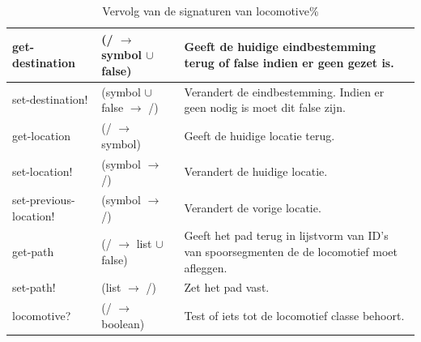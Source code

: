 \documentclass{article}
\begin{document}
\begin{table}[h!]
        \centering
        \begin{tabular}{|p{2.9cm}|p{4cm}|p{6.1cm}|}
                \hline
                get-destination & (/ $\rightarrow$ symbol $\cup$ false) & Geeft de huidige eindbestemming terug of false indien er geen gezet is.\\
                \hline
                set-destination! & (symbol $\cup$ false $\rightarrow$ /) & Verandert de eindbestemming. Indien er geen nodig is moet dit false zijn. \\
                \hline
                get-location & (/ $\rightarrow$ symbol) & Geeft de huidige locatie terug.\\
                \hline
                set-location! & (symbol $\rightarrow$ /) & Verandert de huidige locatie.\\
                \hline
                set-previous-location! & (symbol $\rightarrow$ /) & Verandert de vorige locatie.\\
                \hline
                get-path & (/ $\rightarrow$ list $\cup$ false) & Geeft het pad terug in lijstvorm van ID's van spoorsegmenten de de locomotief moet afleggen.\\
                \hline
                set-path! & (list $\rightarrow$ /) & Zet het pad vast.\\
                \hline
                locomotive? & (/ $\rightarrow$ boolean) & Test of iets tot de locomotief classe behoort.\\
                \hline
        \end{tabular}
        \caption{Vervolg van de signaturen van locomotive\%}
\end{table}
\end{document}
